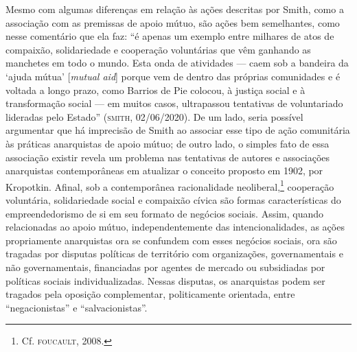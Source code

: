 Mesmo com algumas diferenças em relação às ações descritas por Smith,
como a associação com as premissas de apoio mútuo, são ações bem
semelhantes, como nesse comentário que ela faz: ``é apenas um exemplo
entre milhares de atos de compaixão, solidariedade e cooperação
voluntárias que vêm ganhando as manchetes em todo o mundo. Esta onda de
atividades --- caem sob a bandeira da `ajuda mútua' {[}\emph{mutual
aid}{]} porque vem de dentro das próprias comunidades e é voltada a
longo prazo, como Barrios de Pie colocou, à justiça social e à
transformação social --- em muitos casos, ultrapassou tentativas de
voluntariado lideradas pelo Estado'' (\textsc{smith}, 02/06/2020). De um lado,
seria possível argumentar que há imprecisão de Smith ao associar esse
tipo de ação comunitária às práticas anarquistas de apoio mútuo; de
outro lado, o simples fato de essa associação existir revela um problema
nas tentativas de autores e associações anarquistas contemporâneas em
atualizar o conceito proposto em 1902, por Kropotkin. Afinal, sob a
contemporânea racionalidade neoliberal,\footnote{Cf. \textsc{foucault}, 2008.}
cooperação voluntária, solidariedade social e compaixão cívica são
formas características do empreendedorismo de si em seu formato de
negócios sociais. Assim, quando relacionadas ao apoio mútuo,
independentemente das intencionalidades, as ações propriamente
anarquistas ora se confundem com esses negócios sociais, ora são
tragadas por disputas políticas de território com organizações,
governamentais e não governamentais, financiadas por agentes de mercado
ou subsidiadas por políticas sociais individualizadas. Nessas disputas,
os anarquistas podem ser tragados pela oposição complementar,
politicamente orientada, entre ``negacionistas'' e ``salvacionistas''.


